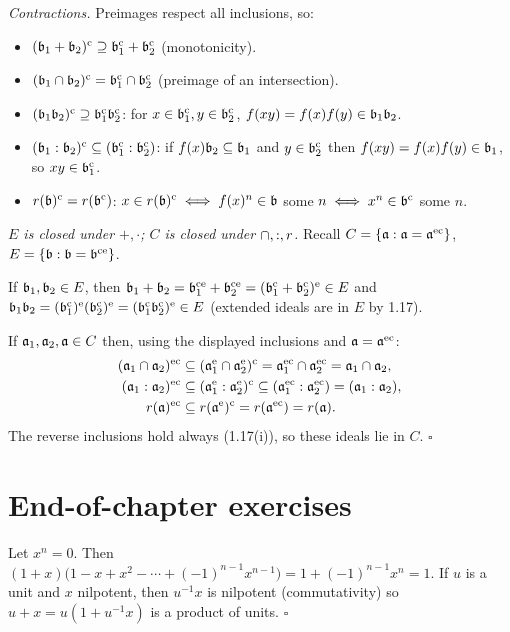 \documentclass[11pt]{article}
\begin{document}
\emph{Contractions.} Preimages respect all inclusions, so:
\begin{itemize}[leftmargin=*]
\item $(\fb_1+\fb_2)^\ci\supseteq\fb_1^\ci+\fb_2^\ci$ (monotonicity).
\item $(\fb_1\cap\fb_2)^\ci=\fb_1^\ci\cap\fb_2^\ci$ (preimage of an intersection).
\item $(\fb_1\fb_2)^\ci\supseteq\fb_1^\ci\fb_2^\ci$: for $x\in\fb_1^\ci,y\in\fb_2^\ci$, $f(xy)=f(x)f(y)\in\fb_1\fb_2$.
\item $(\fb_1:\fb_2)^\ci\subseteq(\fb_1^\ci:\fb_2^\ci)$: if $f(x)\fb_2\subseteq\fb_1$ and $y\in\fb_2^\ci$ then $f(xy)=f(x)f(y)\in\fb_1$, so $xy\in\fb_1^\ci$.
\item $\rad(\fb)^\ci=\rad(\fb^\ci)$: $x\in\rad(\fb)^\ci\iff f(x)^n\in\fb$ some $n\iff x^n\in\fb^\ci$ some $n$.
\end{itemize}

\emph{$E$ is closed under $+,\cdot$; $C$ is closed under $\cap,:,\rad$.} Recall $C=\{\fa:\fa=\fa^{\ex\ci}\}$, $E=\{\fb:\fb=\fb^{\ci\ex}\}$.

If $\fb_1,\fb_2\in E$, then $\fb_1+\fb_2=\fb_1^{\ci\ex}+\fb_2^{\ci\ex}=(\fb_1^\ci+\fb_2^\ci)^\ex\in E$ and $\fb_1\fb_2=(\fb_1^\ci)^\ex(\fb_2^\ci)^\ex=(\fb_1^\ci\fb_2^\ci)^\ex\in E$ (extended ideals are in $E$ by 1.17).

If $\fa_1,\fa_2,\fa\in C$ then, using the displayed inclusions and $\fa=\fa^{\ex\ci}$:
\begin{align*}
(\fa_1\cap\fa_2)^{\ex\ci}&\subseteq(\fa_1^\ex\cap\fa_2^\ex)^\ci=\fa_1^{\ex\ci}\cap\fa_2^{\ex\ci}=\fa_1\cap\fa_2,\\
(\fa_1:\fa_2)^{\ex\ci}&\subseteq(\fa_1^\ex:\fa_2^\ex)^\ci\subseteq(\fa_1^{\ex\ci}:\fa_2^{\ex\ci})=(\fa_1:\fa_2),\\
\rad(\fa)^{\ex\ci}&\subseteq\rad(\fa^\ex)^\ci=\rad(\fa^{\ex\ci})=\rad(\fa).
\end{align*}
The reverse inclusions hold always (1.17(i)), so these ideals lie in $C$. \hfill$\square$

\section*{End-of-chapter exercises}

\pf
Let $x^n=0$. Then $(1+x)\bigl(1-x+x^2-\cdots+(-1)^{n-1}x^{n-1}\bigr)=1+(-1)^{n-1}x^n=1$.
If $u$ is a unit and $x$ nilpotent, then $u^{-1}x$ is nilpotent (commutativity) so $u+x=u(1+u^{-1}x)$ is a product of units. \hfill$\square$
\end{document}
